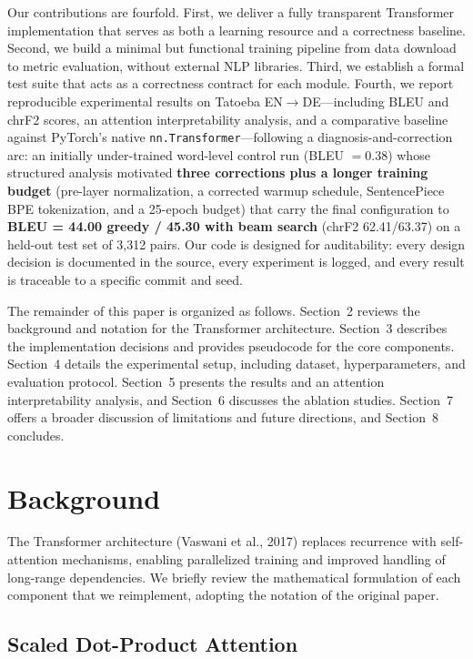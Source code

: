 \documentclass[10pt]{article}
\begin{document}
Our contributions are fourfold. First, we deliver a fully transparent Transformer implementation that serves as both a learning resource and a correctness baseline. Second, we build a minimal but functional training pipeline from data download to metric evaluation, without external NLP libraries. Third, we establish a formal test suite that acts as a correctness contract for each module. Fourth, we report reproducible experimental results on Tatoeba EN$\rightarrow$DE---including BLEU and chrF2 scores, an attention interpretability analysis, and a comparative baseline against PyTorch's native \texttt{nn.Transformer}---following a diagnosis-and-correction arc: an initially under-trained word-level control run (BLEU $= 0.38$) whose structured analysis motivated \textbf{three corrections plus a longer training budget} (pre-layer normalization, a corrected warmup schedule, SentencePiece BPE tokenization, and a 25-epoch budget) that carry the final configuration to \textbf{BLEU = 44.00 greedy / 45.30 with beam search} (chrF2 62.41/63.37) on a held-out test set of 3,312 pairs. Our code is designed for auditability: every design decision is documented in the source, every experiment is logged, and every result is traceable to a specific commit and seed.

The remainder of this paper is organized as follows. Section~2 reviews the background and notation for the Transformer architecture. Section~3 describes the implementation decisions and provides pseudocode for the core components. Section~4 details the experimental setup, including dataset, hyperparameters, and evaluation protocol. Section~5 presents the results and an attention interpretability analysis, and Section~6 discusses the ablation studies. Section~7 offers a broader discussion of limitations and future directions, and Section~8 concludes.

\section{Background}

The Transformer architecture (Vaswani et al., 2017) replaces recurrence with self-attention mechanisms, enabling parallelized training and improved handling of long-range dependencies. We briefly review the mathematical formulation of each component that we reimplement, adopting the notation of the original paper.

\subsection{Scaled Dot-Product Attention}
\end{document}
